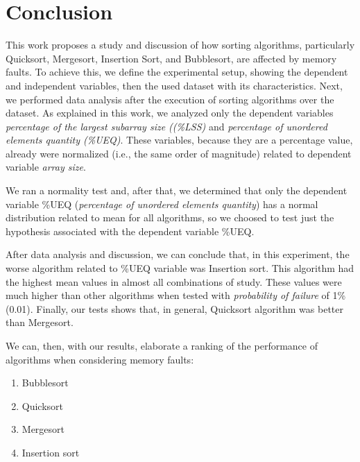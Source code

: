 \section{Conclusion}

This work proposes a study and discussion of how sorting algorithms, particularly Quicksort, Mergesort, Insertion Sort, and Bubblesort, are affected by memory faults. To achieve this, we define the experimental setup, showing the dependent and independent variables, then the used dataset with its characteristics. Next, we performed data analysis after the execution of sorting algorithms over the dataset. As explained in this work, we analyzed only the dependent variables \textit{percentage of the largest subarray size ((\%LSS)} and \textit{percentage of unordered elements quantity (\%UEQ)}. These variables, because they are a percentage value, already were normalized (i.e., the same order of magnitude) related to dependent variable \textit{array size}.

We ran a normality test and, after that, we determined that only the dependent variable \%UEQ (\textit{percentage of unordered elements quantity}) has a normal distribution related to mean for all algorithms, so we choosed to test just the hypothesis associated with the dependent variable \%UEQ.

After data analysis and discussion, we can conclude that, in this experiment, the worse algorithm related to \%UEQ variable was Insertion sort. This algorithm had the highest mean values in almost all combinations of study. These values were much higher than other algorithms when tested with \textit{probability of failure} of 1\% (0.01). Finally, our tests shows that, in general, Quicksort algorithm was better than Mergesort.

We can, then, with our results, elaborate a ranking of the performance of algorithms when considering memory faults:
\begin{enumerate}
    \item Bubblesort
    \item Quicksort
    \item Mergesort
    \item Insertion sort
\end{enumerate}